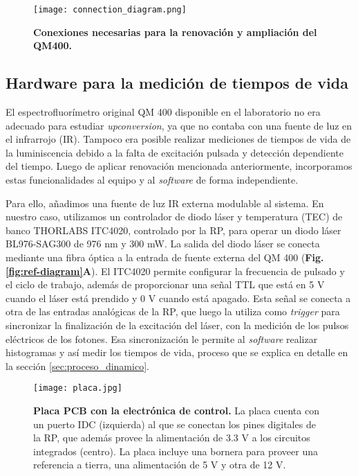\begin{figure}
     \centering
     \texttt{[image: connection\_diagram.png]}
     \caption{
    \textbf{Conexiones necesarias para la renovación y ampliación del QM400.}
    }
     \label{fig:connection_diagram}
\end{figure}



\subsection{Hardware para la medición de tiempos de vida}

El espectrofluorímetro original QM 400 disponible en el laboratorio no era adecuado para estudiar \textit{upconversion}, ya que no contaba con una fuente de luz en el infrarrojo (IR). 
Tampoco era posible realizar mediciones de tiempos de vida de la luminiscencia debido a la falta de excitación pulsada y detección dependiente del tiempo. 
Luego de aplicar renovación mencionada anteriormente, incorporamos estas funcionalidades al equipo y al \textit{software} de forma independiente.

Para ello, añadimos una fuente de luz IR externa modulable al sistema. 
En nuestro caso, utilizamos un controlador de diodo láser y temperatura (TEC) de banco THORLABS ITC4020, controlado por la RP, para operar un diodo láser BL976-SAG300 de 976 nm y 300 mW. 
La salida del diodo láser se conecta mediante una fibra óptica a la entrada de fuente externa del QM 400 (\textbf{Fig. \ref{fig:ref-diagram}A}). 
El ITC4020 permite configurar la frecuencia de pulsado y el ciclo de trabajo, además de proporcionar una señal TTL que está en 5 V cuando el láser está prendido y 0 V cuando está apagado.
Esta señal se conecta a otra de las entradas analógicas de la RP, que luego la utiliza como \textit{trigger} para sincronizar la finalización de la excitación del láser, con la medición de los pulsos eléctricos de los fotones.
Esa sincronización le permite al \textit{software} realizar histogramas y así medir los tiempos de vida, proceso que se explica en detalle en la sección \ref{sec:proceso_dinamico}.  


\begin{figure}[h]
     \centering
     \texttt{[image: placa.jpg]}
     \caption{\textbf{Placa PCB con la electrónica de control.} La placa cuenta con un puerto IDC (izquierda) al que se conectan los pines digitales de la RP, que además provee la alimentación de 3.3 V a los circuitos integrados (centro). La placa incluye una bornera para proveer una referencia a tierra, una alimentación de 5 V y otra de 12 V.}
     \label{fig:placa}
\end{figure}


